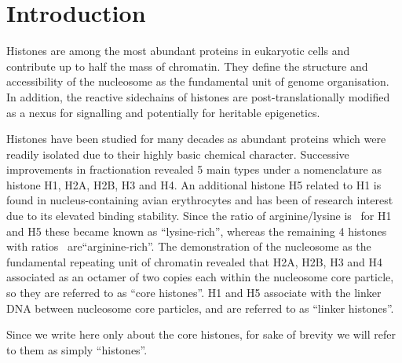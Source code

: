 \documentclass[10pt,a4paper,draft]{article}
\begin{document}
  \section{Introduction}
  \label{sec:intro}

    Histones are among the most abundant proteins in eukaryotic cells and contribute up to half
    the mass of chromatin. They define the structure and accessibility of the nucleosome as the
    fundamental unit of genome organisation. In addition, the reactive sidechains of histones
    are post-translationally modified as a nexus for signalling and potentially for heritable
    epigenetics.

    Histones have been studied for many decades as abundant proteins which were readily isolated
    due to their highly basic chemical character. Successive improvements in fractionation revealed
    5 main types under a nomenclature as histone H1, H2A, H2B, H3 and H4\cite{Histonenomenc}. An additional histone H5
    related to H1 is found in nucleus-containing avian erythrocytes and has been of research interest
    due to its elevated binding stability. Since the ratio of arginine/lysine is \HOneArgLysRatio\ for H1 and H5 these
    became known as ``lysine-rich'', whereas the remaining 4 histones with ratios \OthersArgLysRatio\ are``arginine-rich''.
    The demonstration of the nucleosome as the fundamental repeating unit of chromatin revealed that H2A,
    H2B, H3 and H4 associated as an octamer of two copies each within the nucleosome core particle,
    so they are referred to as ``core histones''. H1 and H5 associate with the linker DNA between
    nucleosome core particles, and are referred to as ``linker histones''.

    Since we write here only about the core histones, for sake of brevity we will refer to them as simply ``histones''.
\end{document}
